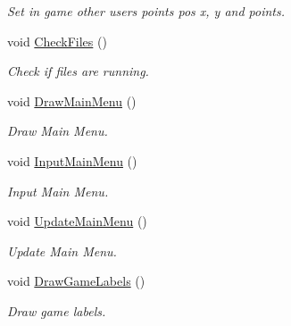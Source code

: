 \begin{DoxyCompactItemize}
\begin{DoxyCompactList}\small\item\em Set in game other users points pos x, y and points. \end{DoxyCompactList}\item 
\mbox{\label{class_scene_a0ca76b15bf796d518b68403ebd66c872}} 
void \hyperlink{class_scene_a0ca76b15bf796d518b68403ebd66c872}{Check\+Files} ()
\begin{DoxyCompactList}\small\item\em Check if files are running. \end{DoxyCompactList}\item 
\mbox{\label{class_scene_a43e948c59bb0e726b0fb91eaabcb1c49}} 
void \hyperlink{class_scene_a43e948c59bb0e726b0fb91eaabcb1c49}{Draw\+Main\+Menu} ()
\begin{DoxyCompactList}\small\item\em Draw Main Menu. \end{DoxyCompactList}\item 
\mbox{\label{class_scene_a03e8c212f77c14c9373c4aa490bfc951}} 
void \hyperlink{class_scene_a03e8c212f77c14c9373c4aa490bfc951}{Input\+Main\+Menu} ()
\begin{DoxyCompactList}\small\item\em Input Main Menu. \end{DoxyCompactList}\item 
\mbox{\label{class_scene_a6cfb68f3859836aeeb4b4da8daacb6f9}} 
void \hyperlink{class_scene_a6cfb68f3859836aeeb4b4da8daacb6f9}{Update\+Main\+Menu} ()
\begin{DoxyCompactList}\small\item\em Update Main Menu. \end{DoxyCompactList}\item 
\mbox{\label{class_scene_abcfd2a3bf65339437d0858b185862645}} 
void \hyperlink{class_scene_abcfd2a3bf65339437d0858b185862645}{Draw\+Game\+Labels} ()
\begin{DoxyCompactList}\small\item\em Draw game labels. \end{DoxyCompactList}\item 
\mbox{\label{class_scene_ac6eb6c5125587a6892014c9f780e3c4e}} 

\end{DoxyCompactItemize}
